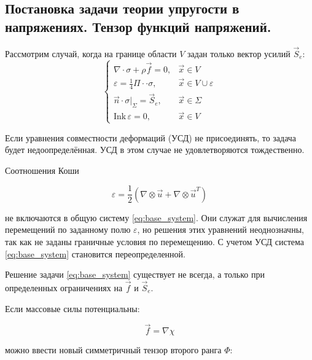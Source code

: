 
\subsection*{Постановка задачи теории упругости в напряжениях. Тензор функций напряжений.}

Рассмотрим случай, когда на границе области \( V \) задан только вектор усилий \( \vec{S}_e \):
\begin{equation}\label{eq:base_system}
    \begin{cases}
        \nabla \cdot \sigma + \rho \vec{f} = 0, & \vec{x} \in V \\
        \varepsilon = \frac{1}{4} \Pi \cdot\cdot \sigma, & \vec{x} \in V \cup \varepsilon \\
        \vec{n} \cdot \sigma |_{\Sigma} = \vec{S}_e, & \vec{x} \in \Sigma \\
        \text{Ink} \, \varepsilon = 0, & \vec{x} \in V
    \end{cases}
\end{equation}

Если уравнения совместности деформаций (УСД) не присоединять, то задача будет недоопределённая. УСД в этом случае не удовлетворяются тождественно.

Соотношения Коши 

\begin{equation}\label{eq:cauchy_relations}
    \varepsilon = \frac{1}{2} (\nabla \otimes \vec{u} + \nabla \otimes \vec{u}^T)
\end{equation}

не включаются в общую систему \eqref{eq:base_system}. Они служат для вычисления перемещений по заданному полю \( \varepsilon \), но решения этих уравнений неоднозначны, так как не заданы граничные условия по перемещению. С учетом УСД система \eqref{eq:base_system} становится переопределенной. 

Решение задачи \eqref{eq:base_system} существует не всегда, а только при определенных ограничениях на \( \vec{f} \) и \( \vec{S}_e \).

Если массовые силы потенциальны:

\begin{equation}\label{eq:mass_forces}
    \vec{f} = \nabla \chi
\end{equation}

можно ввести новый симметричный тензор второго ранга \( \Phi \):

